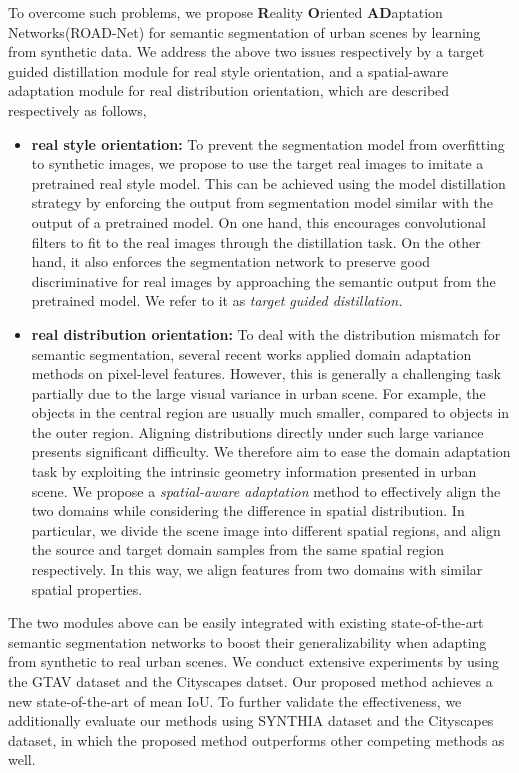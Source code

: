 \documentclass[10pt,twocolumn,letterpaper]{article}
\begin{document}
To overcome such problems, we propose \textbf{R}eality \textbf{O}riented \textbf{AD}aptation Networks(ROAD-Net) for semantic segmentation of urban scenes by learning from synthetic data. We address the above two issues respectively by a target guided distillation module for real style orientation, and a spatial-aware adaptation module for real distribution orientation, which are described respectively as follows,  
\begin{itemize}
\item \textbf{real style orientation: } To prevent the segmentation model from overfitting to  synthetic images, we propose to use the target real images to imitate a pretrained real style model. This can be achieved using the model distillation strategy by enforcing the output from segmentation model similar with the output of a pretrained model. On one hand, this encourages convolutional filters to fit to the real images through the distillation task. On the other hand, it also enforces the segmentation network to preserve good discriminative for real images by approaching the semantic output from the pretrained model. We refer to it as \textit{target guided distillation.} 
\item \textbf{real distribution orientation: } To deal with the distribution mismatch for semantic segmentation, several recent works \cite{hoffman2016fcns,zhang2017curriculum} applied domain adaptation methods on pixel-level features. However, this is generally a challenging task partially due to the large visual variance in urban scene. For example, the objects in the central region are usually much smaller, compared to objects in the outer region. Aligning distributions directly under such large variance presents significant difficulty. We therefore aim to ease the domain adaptation task by exploiting the intrinsic geometry information presented in urban scene. We propose a \textit{spatial-aware adaptation} method to effectively align the two domains while considering the difference in spatial distribution. In particular, we divide the scene image into different spatial regions, and align the source and target domain samples from the same spatial region respectively. In this way, we align features from two domains with similar spatial properties.
\end{itemize}
The two modules above can be easily integrated with existing state-of-the-art semantic segmentation networks to boost their generalizability when adapting from synthetic to real urban scenes. We conduct extensive experiments by using the GTAV dataset and the Cityscapes datset. Our proposed method achieves a new state-of-the-art of  mean IoU. To further validate the effectiveness, we additionally evaluate our methods using SYNTHIA dataset and the Cityscapes dataset, in which the proposed method outperforms other competing methods as well.
\end{document}
